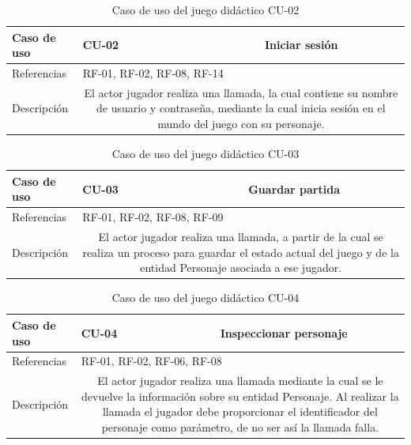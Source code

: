 \begin{table}[H]
	\centering
	\small
	\begin{tabularx}{\linewidth}{|l|cc|}
		\hline
		{\cellcolor[HTML]{C0C0C0} Caso de uso} & \multicolumn{1}{l|}{CU-02} & Iniciar sesión \\ \hline
		{\cellcolor[HTML]{C0C0C0} Referencias} & \multicolumn{2}{l|}{RF-01, RF-02, RF-08, RF-14} \\ \hline
		{\cellcolor[HTML]{C0C0C0} Descripción} & \multicolumn{2}{X|}{El actor jugador realiza una llamada, la cual contiene su nombre de usuario y contraseña, mediante la cual inicia sesión en el mundo del juego con su personaje.} \\ \hline
	\end{tabularx}
	
	\vspace{0.5cm}
	\caption{Caso de uso del juego didáctico CU-02}
	\label{tab:juego-cu-02}
\end{table}

\begin{table}[H]
	\centering
	\small
	\begin{tabularx}{\linewidth}{|l|cc|}
		\hline
		{\cellcolor[HTML]{C0C0C0} Caso de uso} & \multicolumn{1}{l|}{CU-03} & Guardar partida \\ \hline
		{\cellcolor[HTML]{C0C0C0} Referencias} & \multicolumn{2}{l|}{RF-01, RF-02, RF-08, RF-09} \\ \hline
		{\cellcolor[HTML]{C0C0C0} Descripción} & \multicolumn{2}{X|}{El actor jugador realiza una llamada, a partir de la cual se realiza un proceso para guardar el estado actual del juego y de la entidad Personaje asociada a ese jugador.} \\ \hline
	\end{tabularx}
	
	\vspace{0.5cm}
	\caption{Caso de uso del juego didáctico CU-03}
	\label{tab:juego-cu-03}
\end{table}

\begin{table}[H]
	\centering
	\small
	\begin{tabularx}{\linewidth}{|l|cc|}
		\hline
		{\cellcolor[HTML]{C0C0C0} Caso de uso} & \multicolumn{1}{l|}{CU-04} & Inspeccionar personaje \\ \hline
		{\cellcolor[HTML]{C0C0C0} Referencias} & \multicolumn{2}{l|}{RF-01, RF-02, RF-06, RF-08} \\ \hline
		{\cellcolor[HTML]{C0C0C0} Descripción} & \multicolumn{2}{X|}{El actor jugador realiza una llamada mediante la cual se le devuelve la información sobre su entidad Personaje. Al realizar la llamada el jugador debe proporcionar el identificador del personaje como parámetro, de no ser así la llamada falla.} \\ \hline
	\end{tabularx}
	
	\vspace{0.5cm}
	\caption{Caso de uso del juego didáctico CU-04}
	\label{tab:juego-cu-04}
\end{table}

